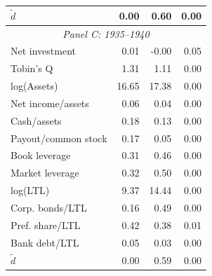 \begin{threeparttable}
\begin{tabular}{lrrr}
\ensuremath{\tilde{d}} & 0.00 & 0.60 & 0.00 \\
\midrule
\multicolumn{4}{c}{\textit{Panel C: 1935--1940}} \\
\midrule
Net investment & 0.01 & -0.00 & 0.05 \\
Tobin's Q & 1.31 & 1.11 & 0.00 \\
log(Assets) & 16.65 & 17.38 & 0.00 \\
Net income/assets & 0.06 & 0.04 & 0.00 \\
Cash/assets & 0.18 & 0.13 & 0.00 \\
Payout/common stock & 0.17 & 0.05 & 0.00 \\
Book leverage & 0.31 & 0.46 & 0.00 \\
Market leverage & 0.32 & 0.50 & 0.00 \\
log(LTL) & 9.37 & 14.44 & 0.00 \\
Corp. bonds/LTL & 0.16 & 0.49 & 0.00 \\
Pref. share/LTL & 0.42 & 0.38 & 0.01 \\
Bank debt/LTL & 0.05 & 0.03 & 0.00 \\
\ensuremath{\tilde{d}} & 0.00 & 0.59 & 0.00 \\
\bottomrule\end{tabular}\end{threeparttable}
